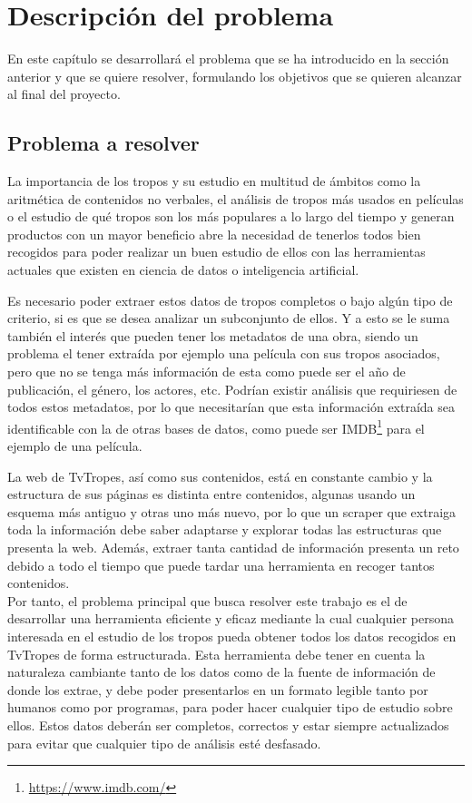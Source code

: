 \chapter{Descripción del problema}

En este capítulo se desarrollará el problema que se ha introducido en la sección
anterior y que se quiere resolver, formulando los objetivos que se quieren
alcanzar al final del proyecto.

\section{Problema a resolver}

La importancia de los tropos y su estudio en multitud de ámbitos como la
aritmética de contenidos no verbales, el análisis de tropos más usados en
películas o el estudio de qué tropos son los más populares a lo largo del tiempo
y generan productos con un mayor beneficio abre la necesidad de tenerlos todos
bien recogidos para poder realizar un buen estudio de ellos con las herramientas
actuales que existen en ciencia de datos o inteligencia artificial. 

Es necesario poder extraer estos datos de tropos completos o bajo algún tipo de
criterio, si es que se desea analizar un subconjunto de ellos. Y a esto se le
suma también el interés que pueden tener los metadatos de una obra, siendo un
problema el tener extraída por ejemplo una película con sus tropos asociados,
pero que no se tenga más información de esta como puede ser el año de
publicación, el género, los actores, etc. Podrían existir análisis que
requiriesen de todos estos metadatos, por lo que necesitarían que esta
información extraída sea identificable con la de otras bases de datos, como
puede ser IMDB\footnote{\url{https://www.imdb.com/}} para el ejemplo de una
película.

La web de TvTropes, así como sus contenidos, está en constante cambio y la
estructura de sus páginas es distinta entre contenidos, algunas usando un
esquema más antiguo y otras uno más nuevo, por lo que un scraper que extraiga
toda la información debe saber adaptarse y explorar todas las estructuras que
presenta la web. Además, extraer tanta cantidad de información presenta un reto
debido a todo el tiempo que puede tardar una herramienta en recoger tantos
contenidos.\\

Por tanto, el problema principal que busca resolver este trabajo es el de
desarrollar una herramienta eficiente y eficaz mediante la cual cualquier
persona interesada en el estudio de los tropos pueda obtener todos los datos
recogidos en TvTropes de forma estructurada. Esta herramienta debe tener en
cuenta la naturaleza cambiante tanto de los datos como de la fuente de
información de donde los extrae, y debe poder presentarlos en un formato legible
tanto por humanos como por programas, para poder hacer cualquier tipo de estudio
sobre ellos. Estos datos deberán ser completos, correctos y estar siempre
actualizados para evitar que cualquier tipo de análisis esté desfasado.\\

